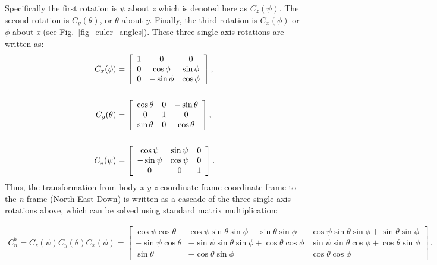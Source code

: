 \documentclass[journal]{IEEEtran}
\makeatletter
\newcommand{\mathleft}{\@fleqntrue\@mathmargin0pt}
\newcommand{\mathcenter}{\@fleqnfalse}
\makeatother
\begin{document}
Specifically the first rotation is $\psi$ about \textit{z} which is denoted here as $C_z(\psi)$. The second rotation is $C_y(\theta)$, or $\theta$ about \textit{y}.
Finally, the third rotation is $C_x(\phi)$ or $\phi$ about \textit{x} (see Fig.~\ref{fig_euler_angles}). These three single axis rotations are written as:
\begin{align}
    C_x(\phi) &= \left[ \begin{array} { c c c  }
    1 & 0 & { 0 } \\ 
    0 & \cos\phi & \sin\phi   \\ 
    0  & -\sin\phi & \cos\phi  
    \end{array} \right], 
    \label{eq_Cx_phi}
    \\[1.5em]
    C_y(\theta) &= 
        \left[ \begin{array} { c c c  }
        \cos\theta & 0 & -\sin\theta  
            \\ 0 & 1 & 0  
            \\  \sin\theta  &0 & \cos\theta
            \end{array} \right], 
    \label{eq_Cx_theta}
    \\[1.5em]
    C_z(\psi) &= 
        \left[ \begin{array} { c c c  } 
        \cos\psi & \sin\psi  & { 0 } \\
            -\sin\psi & \cos\psi & 0  \\ 
            0  & 0 & 1 
            \end{array} \right].
    \label{eq_Cx_psi}
\end{align}
Thus, the transformation from body \textit{x-y-z} coordinate frame coordinate frame to the \textit{n}-frame (North-East-Down)  is written as a cascade of the three single-axis rotations above, which can be solved using standard matrix multiplication:




\begin{twocolequfloat}%
\begin{align}
C_{n}^b=C_z(\psi)C_y(\theta)C_x(\phi)=
\begin{bmatrix}
\cos\psi\cos\theta & \cos\psi\sin\theta \sin\phi +\sin\theta \sin\phi& \cos\psi \sin\theta \sin\phi +\sin\theta \sin\phi\\
-\sin\psi \cos\theta &-\sin\psi \sin\theta \sin\phi +\cos\theta \cos\phi&\sin\psi \sin\theta \cos\phi +\cos\theta \sin\phi \\ 
\sin\theta  &-\cos\theta \sin\phi &\cos\theta \cos\phi 
\end{bmatrix}\,.\label{eq_CDCM}
\end{align} 
\end{twocolequfloat}%
\end{document}

